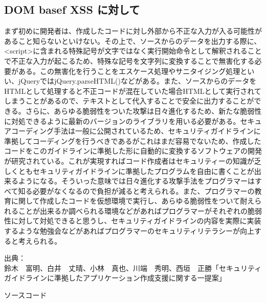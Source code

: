 \documentclass[a4j]{jarticle}
\begin{document}
    \subsection{DOM basef XSS に対して}
      まず初めに開発者は、作成したコードに対し外部から不正な入力が入る可能性があること知らないといけない。その上で、ソースからのデータを出力する際に、\textless script\textgreater に含まれる特殊記号が文字ではなく実行開始命令として解釈されることで不正な入力が起こるため、特殊な記号を文字列に変換することで無害化する必要がある。この無害化を行うことをエスケース処理やサニタイジング処理といい、jQueryではjQuery.parseHTML()などがある。また、ソースからのデータをHTMLとして処理すると不正コードが混在していた場合HTMLとして実行されてしまうことがあるので、テキストとして代入することで安全に出力することができる。さらに、あらゆる脆弱性をついた攻撃は日々進化するため、新たな脆弱性に対処できるように最新のバージョンのライブラリを用いる必要がある。セキュアコーディング手法は一般に公開されているため、セキュリティガイドラインに準拠してコーディングを行うべきであるがこれはまだ容易でないため、作成したコードをこのガイドラインに準拠した形に自動的に変換するソフトウェアの開発が研究されている。これが実現すればコード作成者はセキュリティーの知識が乏しくともセキュリティガイドラインに準拠したプログラムを自由に書くことが出来るようになる。そういった意味では日々進化する攻撃手法をプログラマーはすべて知る必要がなくなるので負担が減ると考えられる。また、プログラマーの教育に関して作成したコードを仮想環境で実行し、あらゆる脆弱性をついて耐えられることが出来るか調べられる環境などがあればプログラマーがそれぞれの脆弱性に対して対処できると思うし、セキュリティガイドラインの内容を実際に実装するような勉強会などがあればプログラマーのセキュリティリテラシーが向上すると考えられる。
      \vspace{1cm}
      \noindent

      出典：\\
      鈴木　富明、白井　丈晴、小林　真也、川端　秀明、西垣　正勝「セキュリティガイドラインに準拠したアプリケーション作成支援に関する一提案」

\newpage
{\rm \huge ソースコード}
  
  \newpage
  
  \newpage
  
  \newpage
  
  \newpage
  
  \newpage
  
  \newpage
  
  \newpage
  
  \newpage
  
  \newpage
\end{document}
